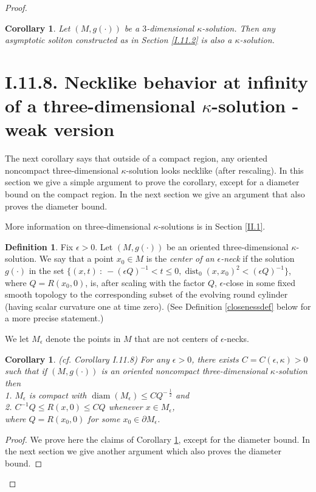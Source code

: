 \documentclass[12pt]{amsart}
\newcommand{\diam}{\operatorname{diam}}
\newcommand{\dist}{\operatorname{dist}}
\numberwithin{equation}{section}
\theoremstyle{plain}
\newtheorem{corollary}[equation]{Corollary}
\theoremstyle{definition}
\newtheorem{definition}[equation]{Definition}
\theoremstyle{remark}
\begin{document}
\begin{proof}
\begin{corollary}
Let $(M,g(\cdot))$ be a $3$-dimensional $\kappa$-solution.
Then any asymptotic soliton constructed as in Section \ref{I.11.2} is
also a $\kappa$-solution.
\end{corollary}


\section{I.11.8. Necklike behavior at infinity of a three-dimensional
$\kappa$-solution - weak version}

The next corollary says that outside of a compact region,  any oriented noncompact
three-dimensional $\kappa$-solution looks necklike (after rescaling). 
In this section we give a simple argument to prove the corollary, except for
a diameter bound on the compact region.  In the next section we give an
argument that also proves the diameter bound.

More information on three-dimensional $\kappa$-solutions is in 
Section \ref{II.1}. 

\begin{definition}
Fix $\epsilon > 0$. Let $(M, g(\cdot))$ be an oriented three-dimensional $\kappa$-solution.
We say that a point $x_0 \in M$ is the {\em center of an $\epsilon$-neck} if the
solution $g(\cdot)$ in the set 
$\{(x,t) \: : \: - (\epsilon Q)^{-1} < t \le 0, \dist_0(x, x_0)^2 < (\epsilon Q)^{-1}\}$,
where $Q = R(x_0, 0)$, is, after scaling with the factor $Q$, $\epsilon$-close
in some fixed smooth topology to the corresponding subset of the
evolving round cylinder (having scalar curvature one at time zero).
(See Definition \ref{closenessdef} below for a more precise statement.)

We let $M_\epsilon$ denote the points in $M$ that are not centers of
$\epsilon$-necks.
\end{definition}

\begin{corollary} (cf. Corollary I.11.8) \label{corI.11.8}
For any $\epsilon > 0$, there exists $C = C(\epsilon, \kappa) > 0$ such that
if $(M, g(\cdot))$ is an oriented noncompact three-dimensional $\kappa$-solution then \\
1.  $M_\epsilon$ is compact with $\diam(M_\epsilon) \le C Q^{- \: \frac12}$ and \\
2. $C^{-1} Q \le R(x,0) \le CQ$ whenever $x \in M_\epsilon$, \\
where $Q = R(x_0, 0)$ for some $x_0 \in \partial M_\epsilon$.
\end{corollary}
\begin{proof}
We  prove here the claims of 
Corollary \ref{corI.11.8}, except for the
diameter bound. In the next section we give another argument which
also proves the diameter bound.


\end{proof}
\end{proof}
\end{document}
